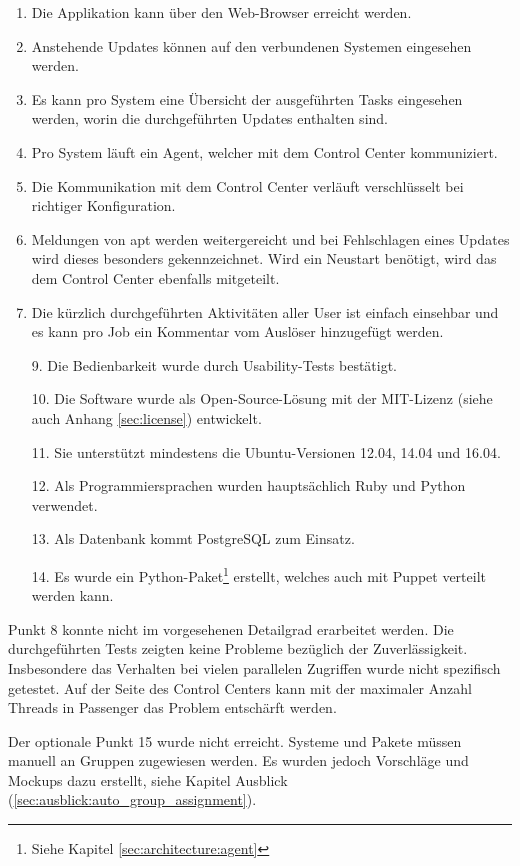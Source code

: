 \begin{enumerate}[noitemsep]
    \item Die Applikation kann über den Web-Browser erreicht werden.
    \item Anstehende Updates können auf den verbundenen Systemen eingesehen werden.
    \item Es kann pro System eine Übersicht der ausgeführten Tasks eingesehen werden, worin die durchgeführten Updates enthalten sind.
    \item Pro System läuft ein Agent, welcher mit dem Control Center kommuniziert.
    \item Die Kommunikation mit dem Control Center verläuft verschlüsselt bei richtiger Konfiguration.
    \item Meldungen von \gls{apt} werden weitergereicht und bei Fehlschlagen eines Updates wird dieses besonders gekennzeichnet. Wird ein Neustart benötigt, wird das dem Control Center ebenfalls mitgeteilt.
    \item Die kürzlich durchgeführten Aktivitäten aller User ist einfach einsehbar und es kann pro Job ein Kommentar vom Auslöser hinzugefügt werden.
    \item [9.] Die Bedienbarkeit wurde durch Usability-Tests bestätigt.
    \item [10.] Die Software wurde als Open-Source-Lösung mit der MIT-Lizenz (siehe auch Anhang \ref{sec:license}) entwickelt.
    \item [11.] Sie unterstützt mindestens die Ubuntu-Versionen 12.04, 14.04 und 16.04.
    \item [12.] Als Programmiersprachen wurden hauptsächlich Ruby und Python verwendet.
    \item [13.] Als Datenbank kommt PostgreSQL zum Einsatz.
    \item [14.] Es wurde ein Python-Paket\footnote{Siehe Kapitel \ref{sec:architecture:agent}} erstellt, welches auch mit Puppet verteilt werden kann.
\end{enumerate}

Punkt 8 konnte nicht im vorgesehenen Detailgrad erarbeitet werden. Die durchgeführten Tests zeigten keine Probleme bezüglich der Zuverlässigkeit. Insbesondere das Verhalten bei vielen parallelen Zugriffen wurde nicht spezifisch getestet. Auf der Seite des Control Centers kann mit der maximaler Anzahl Threads in Passenger das Problem entschärft werden.

\xxx[mehr?]

Der optionale Punkt 15 wurde nicht erreicht. Systeme und Pakete müssen manuell an Gruppen zugewiesen werden. Es wurden jedoch Vorschläge und Mockups dazu erstellt, siehe Kapitel Ausblick (\ref{sec:ausblick:auto_group_assignment}).

